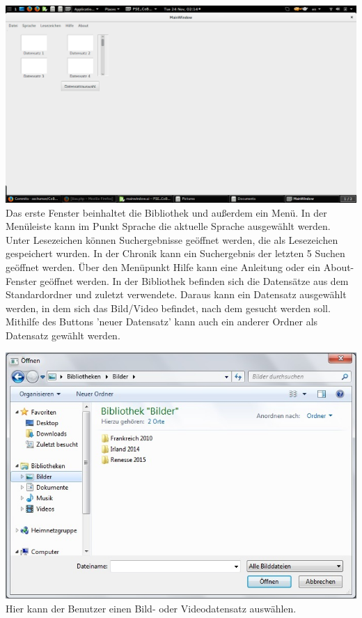 \includegraphics[width=1\linewidth]{img/MainWindow}
Das erste Fenster beinhaltet die Bibliothek und außerdem ein Menü. In der Menüleiste kann im Punkt Sprache die aktuelle Sprache ausgewählt werden. Unter Lesezeichen können Suchergebnisse geöffnet werden, die als Lesezeichen gespeichert wurden. In der Chronik kann ein Suchergebnis der letzten 5 Suchen geöffnet werden. Über den Menüpunkt Hilfe kann eine Anleitung oder ein About-Fenster geöffnet werden.
In der Bibliothek befinden sich die Datensätze aus dem Standardordner und zuletzt verwendete. Daraus kann ein Datensatz ausgewählt werden, in dem sich das Bild/Video befindet, nach dem gesucht werden soll. Mithilfe des Buttons 'neuer Datensatz' kann auch ein anderer Ordner als Datensatz gewählt werden.

\includegraphics[width=1\linewidth]{img/FileChooser}
Hier kann der Benutzer einen Bild- oder Videodatensatz auswählen.


